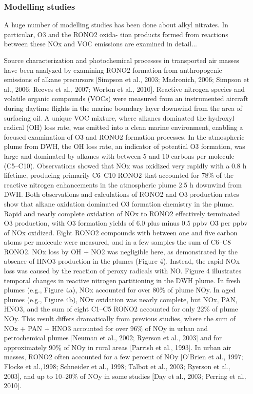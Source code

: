 \documentclass[11pt,a4paper]{article}
\begin{document}
\subsubsection{Modelling studies}
A huge number of modelling studies has been done about alkyl nitrates. In particular, O3 and the RONO2 oxida- tion products formed from reactions between these NOx and VOC emissions are examined in detail...

\citep{Neuman2012}
Source characterization and photochemical processes in transported air masses have been analyzed by examining RONO2 formation from anthropogenic emissions of alkane precursors [Simpson et al., 2003; Madronich, 2006; Simpson et al., 2006; Reeves et al., 2007; Worton et al., 2010].
Reactive nitrogen species and volatile organic compounds (VOCs) were measured from an instrumented aircraft during daytime flights in the marine boundary layer downwind from the area of surfacing oil. A unique VOC mixture, where alkanes dominated the hydroxyl radical (OH) loss rate, was emitted into a clean marine environment, enabling a focused examination of O3 and RONO2 formation processes. In the atmospheric plume from DWH, the OH loss rate, an indicator of potential O3 formation, was large and dominated by alkanes with between 5 and 10 carbons per molecule (C5–C10). Observations showed that NOx was oxidized very rapidly with a 0.8 h lifetime, producing primarily C6–C10 RONO2 that accounted for 78\% of the reactive nitrogen enhancements in the atmospheric plume 2.5 h downwind from DWH. Both observations and calculations of RONO2 and O3 production rates show that alkane oxidation dominated O3 formation chemistry in the plume. Rapid and nearly complete oxidation of NOx to RONO2 effectively terminated O3 production, with O3 formation
yields of 6.0 plus minus 0.5 ppbv O3 per ppbv of NOx oxidized.
Eight RONO2 compounds with between one and five carbon atoms
per molecule were measured, and in a few samples the sum of C6–C8 RONO2.
NOx loss by OH + NO2 was negligible here, as demonstrated by the absence of HNO3 production in the plumes (Figure 4). Instead, the rapid NOx loss was caused by the reaction of peroxy radicals with NO.
Figure 4 illustrates temporal changes in reactive nitrogen partitioning in the DWH plume. In fresh plumes (e.g., Figure 4a), NOx accounted for over 80\% of plume NOy. In aged plumes (e.g., Figure 4b), NOx oxidation was nearly complete, but NOx, PAN, HNO3, and the sum of eight C1–C5 RONO2 accounted for only 22\% of plume NOy. This result differs dramatically from previous studies, where the sum of NOx + PAN + HNO3 accounted for over 96\% of NOy in urban and petrochemical plumes [Neuman et al., 2002; Ryerson et al., 2003] and for approximately 90\% of NOy in rural areas [Parrish et al., 1993]. In urban air masses, RONO2 often accounted for a few percent of NOy [O’Brien et al., 1997; Flocke et al.,1998; Schneider et al., 1998; Talbot et al., 2003; Ryerson et al., 2003], and up to 10–20\% of NOy in some studies [Day et al., 2003; Perring et al., 2010].
\end{document}
